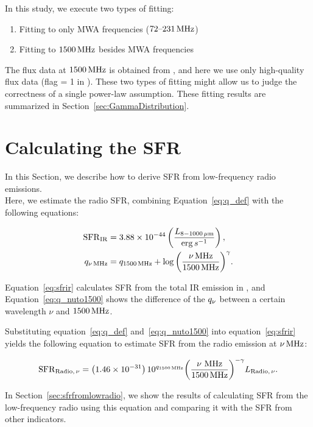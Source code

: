 In this study, we execute two types of fitting:

\begin{enumerate}
    \item Fitting to only MWA frequencies ($72\mbox{--}231\,\mathrm{MHz}$)
    \item Fitting to $1500\,\mathrm{MHz}$ besides MWA frequencies
\end{enumerate}

The flux data at $1500\,\mathrm{MHz}$ is obtained from \citet{Boselli2015}, and here we use only high-quality flux data (flag = 1 in \citealt{Boselli2015}).
These two types of fitting might allow us to judge the correctness of a single power-law assumption.
These fitting results are summarized in Section~\ref{sec:GammaDistribution}.



\section{Calculating the SFR}\label{sec:calculatingsfr}
In this Section, we describe how to derive SFR from low-frequency radio emissions.\\
Here, we estimate the radio SFR, combining Equation~\ref{eq:q_def} with the following equations:

\begin{align}
    \mathrm{SFR}_{\mathrm{IR}} &= 3.88 \times 10^{-44}\left(\frac{L_{\mathrm{8-1000\,\mu m}}}{\mathrm{erg}\,s^{-1}}\right)\label{eq:sfrir},\\
    q_{\nu\,\mathrm{MHz}} &= q_{\mathrm{1500\,\mathrm{MHz}}} + \log{\left(\frac{\nu\,\mathrm{MHz}}{1500\,\mathrm{MHz}}\right)}^{\gamma}\label{eq:q_nuto1500}.
\end{align}

Equation~\ref{eq:sfrir} calculates SFR from the total IR emission in \citet{Murphy2011}, and Equation~\ref{eq:q_nuto1500} shows the difference of the $q_{\nu}$ between a certain wavelength $\nu$ and $1500\,\mathrm{MHz}$.

Substituting equation~\ref{eq:q_def} and~\ref{eq:q_nuto1500} into equation~\ref{eq:sfrir} yields the following equation to estimate SFR from the radio emission at $\nu\,\mathrm{MHz}$:

\begin{equation}\label{eq:sfrfromradio}
    \mathrm{SFR}_{\mathrm{Radio},\,\nu} = \left(1.46\times10^{-31}\right) 10^{q_{\mathrm{1500\,\mathrm{MHz}}}} {\left(\frac{\nu\,\,\mathrm{MHz}}{1500\,\mathrm{MHz}}\right)}^{-\gamma} L_{\mathrm{Radio},\,\nu}.
\end{equation}

In Section~\ref{sec:sfrfromlowradio}, we show the results of calculating SFR from the low-frequency radio using this equation and comparing it with the SFR from other indicators.



%
%

